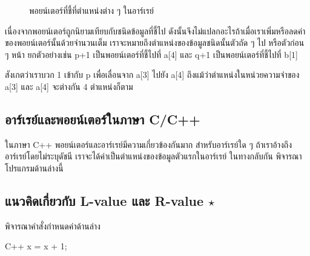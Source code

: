 \begin{figure}
\begin{center}
\end{center}
\caption{พอยน์เตอร์ที่{\wbr}ชี้{\wbr}ที่{\wbr}ตำแหน่ง{\wbr}ต่าง ๆ ใน{\wbr}อาร์เรย์}
\label{fig:array-array-pointer-arith}
\end{figure}

เนื่องจาก{\wbr}พอยน์เตอร์{\wbr}ถูก{\wbr}นิยาม{\wbr}เทียบ{\wbr}กับ{\wbr}ชนิด{\wbr}ข้อมูล{\wbr}ที่{\wbr}ชี้{\wbr}ไป{\wbr}
ดังนั้น{\wbr}จึง{\wbr}ไม่{\wbr}แปลก{\wbr}อะไร{\wbr}ถ้า{\wbr}เมื่อ{\wbr}เรา{\wbr}เพิ่ม{\wbr}หรือ{\wbr}ลด{\wbr}ค่า{\wbr}ของ{\wbr}พอยน์เตอร์{\wbr}นั้น{\wbr}ด้วย{\wbr}จำนวนเต็ม{\wbr}
เรา{\wbr}จะ{\wbr}หมายถึง{\wbr}ตำแหน่ง{\wbr}ของ{\wbr}ข้อมูล{\wbr}ชนิด{\wbr}นั้น{\wbr}ตัว{\wbr}ถัด ๆ ไป หรือ{\wbr}ตัว{\wbr}ก่อน ๆ หน้า ยก{\wbr}ตัวอย่าง{\wbr}เช่น {\ct
  p+1} เป็น{\wbr}พอยน์เตอร์{\wbr}ที่{\wbr}ชี้{\wbr}ไป{\wbr}ที่ {\ct a[4]} และ {\ct q+1} เป็น{\wbr}พอยน์เตอร์{\wbr}ที่{\wbr}ชี้{\wbr}ไป{\wbr}ที่{\wbr}
{\ct b[1]}

สังเกต{\wbr}ว่า{\wbr}เรา{\wbr}บวก 1 เข้า{\wbr}กับ {\ct p} เพื่อ{\wbr}เลื่อน{\wbr}จาก {\ct a[3]} ไป{\wbr}ยัง {\ct a[4]}
ถึงแม้ว่า{\wbr}ตำแหน่ง{\wbr}ใน{\wbr}หน่วยความจำ{\wbr}ของ {\ct a[3]} และ {\ct a[4]} จะ{\wbr}ต่าง{\wbr}กัน 4
ตำแหน่ง{\wbr}ก็ตาม{\wbr}

\subsection{อาร์เรย์{\wbr}และ{\wbr}พอยน์เตอร์{\wbr}ใน{\wbr}ภาษา C/C++}
\label{sect:array-array-pointer-c}

ใน{\wbr}ภาษา C++ พอยน์เตอร์{\wbr}และ{\wbr}อาร์เรย์{\wbr}มี{\wbr}ความ{\wbr}เกี่ยวข้อง{\wbr}กัน{\wbr}มาก สำหรับ{\wbr}อาร์เรย์{\wbr}ใด ๆ
ถ้า{\wbr}เรา{\wbr}อ้าง{\wbr}ถึง{\wbr}อาร์เรย์{\wbr}โดย{\wbr}ไม่{\wbr}ระบุ{\wbr}ดัชนี เรา{\wbr}จะ{\wbr}ได้{\wbr}ค่า{\wbr}เป็น{\wbr}ตำแหน่ง{\wbr}ของ{\wbr}ข้อมูล{\wbr}ตัว{\wbr}แรก{\wbr}ใน{\wbr}อาร์เรย์
ใน{\wbr}ทาง{\wbr}กลับ{\wbr}กัน พิจารณา{\wbr}โปรแกรม{\wbr}ด้าน{\wbr}ล่าง{\wbr}นี้{\wbr}

\subsection{แนว{\wbr}คิด{\wbr}เกี่ยวกับ L-value และ R-value $\star$}
\label{sect:array-lval-rval}

พิจารณา{\wbr}คำสั่ง{\wbr}กำหนด{\wbr}ค่า{\wbr}ด้าน{\wbr}ล่าง{\wbr}

\latintext
\begin{codelist}{C++}{}
x = x + 1;
\end{codelist}
\thaitext


